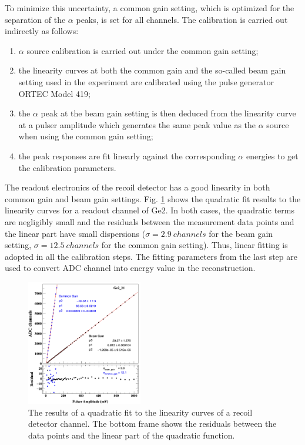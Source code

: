 \documentclass[number,5p]{elsarticle}
\begin{document}
To minimize this uncertainty, a common gain setting, which is optimized for the separation of the \(\alpha\) peaks, is set for all channels.
The calibration is carried out indirectly as follows:
\begin{enumerate}
\item \(\alpha\) source calibration is carried out under the common gain setting;
\item the linearity curves at both the common gain and the so-called beam gain
  setting used in the experiment are calibrated using the pulse generator ORTEC Model 419;
\item the $\alpha$ peak at the beam gain setting is then deduced
  from the linearity curve at a pulser amplitude which generates the same peak
  value as the $\alpha$ source when using the common gain setting;
\item the peak responses are fit linearly against the corresponding $\alpha$ energies
  to get the calibration parameters.
\end{enumerate}
The readout electronics of the recoil detector has a good linearity in both common gain and beam gain settings.
Fig. \ref{fig:electronic_linearity} shows the quadratic fit results to the linearity curves for a readout channel of Ge2.
In both cases, the quadratic terms are negligibly small and the residuals
between the measurement data points and the linear part have small dispersions
($\sigma=\SI{2.9}{channels}$ for the beam gain setting, $\sigma=\SI{12.5}{channels}$ for the common gain setting).
Thus, linear fitting is adopted in all the calibration steps.
The fitting parameters from the last step are used to convert ADC channel into
energy value in the reconstruction.
\begin{figure}[htb!]
  \centering
  \includegraphics[width=0.45\textwidth]{./linearity_quadratic_residual.png}
  \caption{The results of a quadratic fit to the linearity curves of a recoil
    detector channel. The bottom frame shows the residuals between the data
    points and the linear part of the quadratic function.}
  \label{fig:electronic_linearity}
\end{figure}
\end{document}
